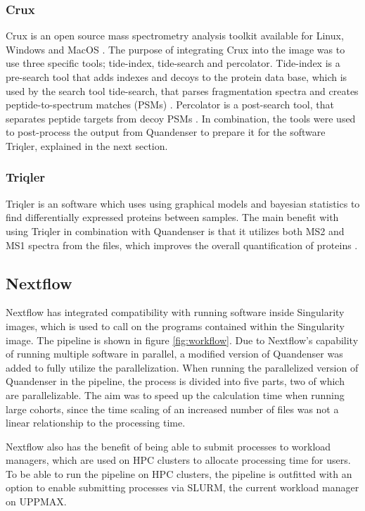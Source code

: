 \subsubsection{Crux}
Crux is an open source mass spectrometry analysis toolkit available for Linux, Windows and MacOS \cite{crux}. The purpose of integrating Crux into the image was to use three specific tools; tide-index, tide-search and percolator. Tide-index is a pre-search tool that adds indexes and decoys to the protein data base, which is used by the search tool tide-search, that parses fragmentation spectra and creates peptide-to-spectrum matches (PSMs) \cite{tide-search}. Percolator is a post-search tool, that separates peptide targets from decoy PSMs \cite{percolator}. In combination, the tools were used to post-process the output from Quandenser to prepare it for the software Triqler, explained in the next section.

\subsubsection{Triqler}
Triqler is an software which uses using graphical models and bayesian statistics to find differentially expressed proteins between samples. The main benefit with using Triqler in combination with Quandenser is that it utilizes both MS2 and MS1 spectra from the files, which improves the overall quantification of proteins \cite{triqler}.

\subsection{Nextflow}

Nextflow has integrated compatibility with running software inside Singularity images, which is used to call on the programs contained within the Singularity image. The pipeline is shown in figure \ref{fig:workflow}. Due to Nextflow's capability of running multiple software in parallel, a modified version of Quandenser was added to fully utilize the parallelization. When running the parallelized version of Quandenser in the pipeline, the process is divided into five parts, two of which are parallelizable. The aim was to speed up the calculation time when running large cohorts, since the time scaling of an increased number of files was not a linear relationship to the processing time.

Nextflow also has the benefit of being able to submit processes to workload managers, which are used on HPC clusters to allocate processing time for users. To be able to run the pipeline on HPC clusters, the pipeline is outfitted with an option to enable submitting processes via SLURM, the current workload manager on UPPMAX.


